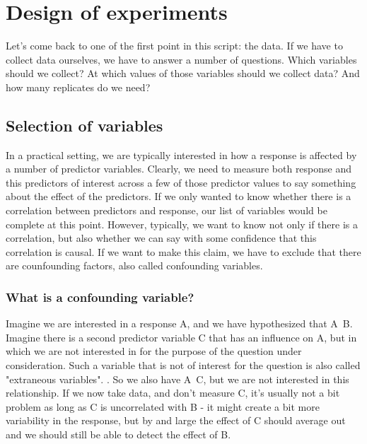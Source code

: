 \documentclass[a4paper,twoside]{tufte-book}\usepackage[]{graphicx}\usepackage[]{color}
\begin{document}
{\chapter{Design of experiments}\label{cha: design of experiments}

Let's come back to one of the first point in this script: the data. If we have to collect data ourselves, we have to answer a number of questions. Which variables should we collect? At which values of those variables should we collect data? And how many replicates do we need?


\section{Selection of variables}

In a practical setting, we are typically interested in how a response is affected by a number of predictor variables. Clearly, we need to measure both response and this predictors of interest across a few of those predictor values to say something about the effect of the predictors.  If we only wanted to know whether there is a correlation between predictors and response, our list of variables would be complete at this point. However, typically, we want to know not only if there is a correlation, but also whether we can say with some confidence that this correlation is causal. If we want to make this claim, we have to exclude that there are counfounding factors, also called confounding variables. 

\subsection{What is a confounding variable?}

Imagine we are interested in a response A, and we have hypothesized that A~B. Imagine there is a second predictor variable C that has an influence on A, but in which we are not interested in for the purpose of the question under consideration. Such a variable that is not of interest for the question is also called "extraneous variables". . So we also have A~C, but we are not interested in this relationship. If we now take data, and don't measure C, it's usually not a bit problem as long as C is uncorrelated with B - it might create a bit more variability in the response, but by and large the effect of C should average out and we should still be able to detect the effect of B.

}
\end{document}
